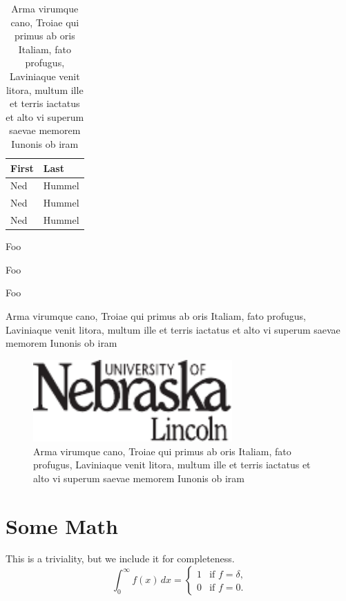 \documentclass[phd, print]{nuthesis}
\begin{document}
\begin{table}[h]
  \centering
  \begin{tabular}{ll}\toprule
    First & Last \\ \midrule
    Ned & Hummel \\
    Ned & Hummel \\
    Ned & Hummel \\ \bottomrule
  \end{tabular}
  \caption{Arma virumque cano, Troiae qui primus ab oris Italiam, fato profugus,
Laviniaque venit litora, multum ille et terris iactatus et alto vi
superum saevae memorem Iunonis ob iram}
  \label{tab:tabular}
\end{table}

\begin{table}[h]
  \centering

  \begin{compactitem}[\checkmark]
    \item Foo
    \item Foo
    \item Foo
    \end{compactitem}

  \caption{Arma virumque cano, Troiae qui primus ab oris Italiam, fato profugus,
Laviniaque venit litora, multum ille et terris iactatus et alto vi
superum saevae memorem Iunonis ob iram}
  \label{tab:list}
\end{table}

\begin{figure}[h]
  \centering
  \includegraphics[width=3in]{figures/unl}
  \caption{Arma virumque cano, Troiae qui primus ab oris Italiam, fato profugus,
Laviniaque venit litora, multum ille et terris iactatus et alto vi
superum saevae memorem Iunonis ob iram}
  \label{fig:test}
\end{figure}

\chapter{Some Math}\label{chap:math}

This is a triviality, but we include it for completeness.
\begin{equation}
\int_0^\infty f(x) \, dx =
\begin{cases} 1 & \mbox{if $f=\delta$,} \\
0 & \mbox{if $f=0$.} \end{cases}
\end{equation}
\end{document}
